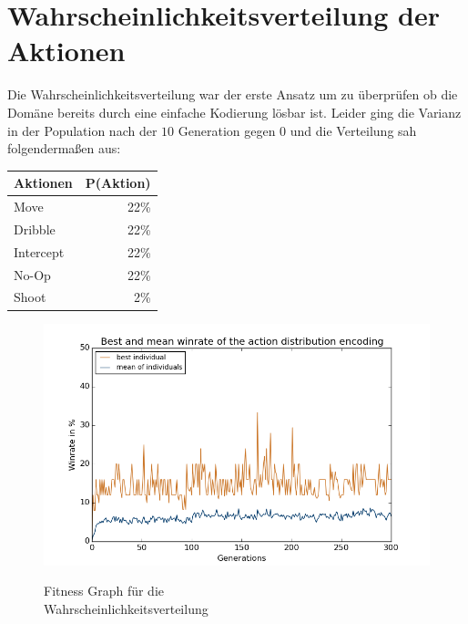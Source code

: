             \section{Wahrscheinlichkeitsverteilung der Aktionen}
                \begin{multicols}{2}
                    \noindent
                    Die Wahrscheinlichkeitsverteilung war der erste Ansatz um zu überprüfen ob die Domäne bereits durch eine einfache Kodierung lösbar ist. Leider ging die Varianz in der Population nach der $10$ Generation gegen $0$ und die Verteilung sah folgendermaßen aus:
                    \begin{table}[H]
                        \begin{center}
                        \begin{tabular}{ |l|r| } 
                            \hline
                            \hfill Aktionen & P(Aktion)  \\ \hline
                            Move      & 22\% \\ \hline
                            Dribble   & 22\% \\ \hline
                            Intercept & 22\% \\ \hline
                            No-Op     & 22\% \\ \hline
                            Shoot     &  2\% \\ \hline
                        \end{tabular}
                        \end{center}
                    \end{table}

                    \begin{figure}[H]
                        \centering
                        \includegraphics[scale=0.5]{../pictures/summary/actiondist-fitness.png}\\
                        \caption{Fitness Graph für die \\Wahrscheinlichkeitsverteilung}\label{fig:graph-ac}
                    \end{figure}
                \end{multicols}
